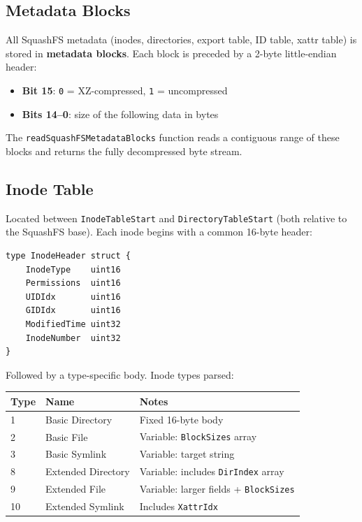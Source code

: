 \documentclass[11pt,a4paper]{article}
\begin{document}
\subsection{Metadata Blocks}

All SquashFS metadata (inodes, directories, export table, ID table, xattr
table) is stored in \textbf{metadata blocks}. Each block is preceded by a
2-byte little-endian header:

\begin{itemize}
    \item \textbf{Bit 15}: \texttt{0} = XZ-compressed,
          \texttt{1} = uncompressed
    \item \textbf{Bits 14--0}: size of the following data in bytes
\end{itemize}

The \texttt{readSquashFSMetadataBlocks} function reads a contiguous range
of these blocks and returns the fully decompressed byte stream.

\newpage
\subsection{Inode Table}

Located between \texttt{InodeTableStart} and \texttt{DirectoryTableStart}
(both relative to the SquashFS base). Each inode begins with a common
16-byte header:

\begin{lstlisting}[style=gostyle]
type InodeHeader struct {
    InodeType    uint16
    Permissions  uint16
    UIDIdx       uint16
    GIDIdx       uint16
    ModifiedTime uint32
    InodeNumber  uint32
}
\end{lstlisting}

Followed by a type-specific body. Inode types parsed:

\begin{center}
\begin{tabular}{lll}
\toprule
\textbf{Type} & \textbf{Name} & \textbf{Notes} \\
\midrule
1  & Basic Directory    & Fixed 16-byte body \\
2  & Basic File         & Variable: \texttt{BlockSizes} array \\
3  & Basic Symlink      & Variable: target string \\
8  & Extended Directory & Variable: includes \texttt{DirIndex} array \\
9  & Extended File      & Variable: larger fields + \texttt{BlockSizes} \\
10 & Extended Symlink   & Includes \texttt{XattrIdx} \\
\bottomrule
\end{tabular}
\end{center}
\end{document}

